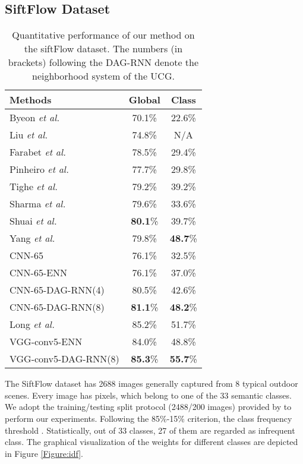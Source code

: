 \documentclass[10pt,twocolumn,letterpaper]{article}
\begin{document}
\subsection{SiftFlow Dataset}
\begin{table}[t]
\footnotesize
\begin{center}
\begin{tabular}{|l|cc|}
\hline
Methods & Global & Class \\
\hline
Byeon \emph{et al.} \cite{byeon2015scene} & 70.1\% & 22.6\% \\
Liu \emph{et al.}\cite{liu2009nonparametric} & 74.8\% & N/A \\
Farabet \emph{et al.} \cite{farabet2013learning} & 78.5\% & 29.4\% \\
Pinheiro \emph{et al.} \cite{pinheiro2014recurrent} & 77.7\% & 29.8\% \\
Tighe \emph{et al.}\cite{tighe2013finding} & 79.2\% & 39.2\% \\
Sharma \emph{et al.}\cite{sharma2014recursive} & 79.6\% & 33.6\% \\
Shuai \emph{et al.}\cite{shuai2015integrating} & \textbf{80.1}\% & 39.7\% \\
Yang \emph{et al.}\cite{yang2014context} & 79.8\% & \textbf{48.7}\% \\
\hline
CNN-65 & 76.1\% & 32.5\% \\
CNN-65-ENN & 76.1\% & 37.0\% \\
CNN-65-DAG-RNN(4) & 80.5\% & 42.6\% \\
CNN-65-DAG-RNN(8) & \textbf{81.1}\% & \textbf{48.2}\% \\
\hline
\hline
Long \emph{et al.}\cite{long2015fully} & 85.2\% & 51.7\% \\
\hline
VGG-conv5-ENN & 84.0\% & 48.8\% \\
VGG-conv5-DAG-RNN(8) & \textbf{85.3}\% & \textbf{55.7}\% \\
\hline
\end{tabular}
\end{center}
\caption{Quantitative performance of our method on the siftFlow dataset. The numbers (in brackets) following the DAG-RNN denote the neighborhood system of the UCG.}
\label{Table:result_SiftFlow}
\end{table}

The SiftFlow dataset has 2688 images generally captured from 8 typical outdoor scenes. Every image has  pixels, which belong to one of the 33 semantic classes. We adopt the training/testing split protocol (2488/200 images) provided by \cite{liu2009nonparametric} to perform our experiments.  Following the 85\%-15\% criterion, the class frequency threshold . Statistically, out of 33 classes, 27 of them are regarded as infrequent class. The graphical visualization of the weights for different classes are depicted in Figure \ref{Figure:idf}.
\end{document}
